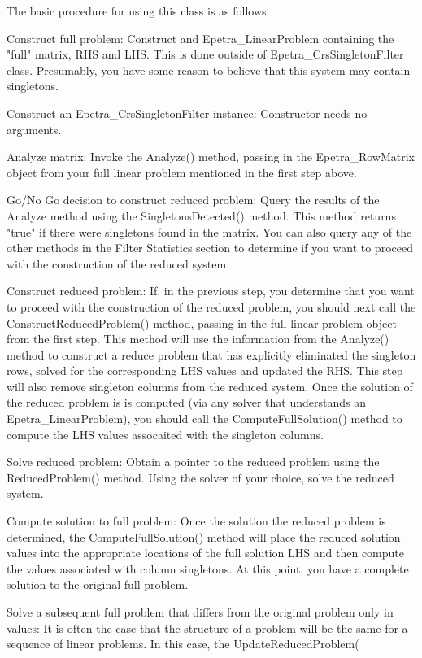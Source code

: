 The basic procedure for using this class is as follows:
\begin{EpetraItemize}
\item Construct full problem: 
      Construct and Epetra\_LinearProblem containing the "full" matrix, RHS and LHS.  
      This is done outside of Epetra\_CrsSingletonFilter class.  Presumably, you have 
      some reason to believe that this system may contain singletons.
\item Construct an Epetra\_CrsSingletonFilter instance:  Constructor needs no arguments.
\item Analyze matrix: 
      Invoke the Analyze() method, passing in the Epetra\_RowMatrix object from your full 
      linear problem mentioned in the first step above.
\item Go/No Go decision to construct reduced problem: 
      Query the results of the Analyze method using the SingletonsDetected() method.  
      This method returns "true" if there were singletons found in the matrix.  You can 
      also query any of the other methods
      in the Filter Statistics section to determine if you want to proceed with the
      construction of the reduced system.
\item Construct reduced problem: 
     If, in the previous step, you determine that you want to proceed with the
     construction of the reduced problem, you should next call the 
     ConstructReducedProblem() method, passing in the full linear problem object from the first
     step.  This method will use the information from the Analyze() method to construct a
     reduce problem that has
     explicitly eliminated the singleton rows, solved for the corresponding LHS values and
     updated the RHS.  This 
     step will also remove singleton columns from the reduced system.  Once the solution
     of the reduced problem is
     is computed (via any solver that understands an Epetra\_LinearProblem), you should
     call the ComputeFullSolution()
     method to compute the LHS values assocaited with the singleton columns.
\item Solve reduced problem: 
     Obtain a pointer to the reduced problem using the
     ReducedProblem() method.  Using the solver of your choice, solve the reduced system.
\item Compute solution to full problem:  
     Once the solution the reduced problem is
     determined, the ComputeFullSolution()
     method will place the reduced solution values into the appropriate locations of the
     full solution LHS and then
     compute the values associated with column singletons.  At this point, you have a
     complete solution to the original
     full problem.
\item Solve a subsequent full problem that differs from the original problem only in
values: It is often the case that the
     structure of a problem will be the same for a sequence of linear problems.  In this
     case, the UpdateReducedProblem(

\end{EpetraItemize}

